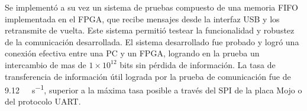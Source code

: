 Se implementó a su vez un sistema de pruebas compuesto de una memoria FIFO implementada en el FPGA, que recibe mensajes desde la interfaz USB y los retransmite de vuelta. Este sistema permitió testear la funcionalidad y robustez de la comunicación desarrollada.
El sistema desarrollado fue probado y logró una conexión efectiva entre una PC y un FPGA, logrando en la prueba un intercambio de mas de $1 \times 10^{12}$ bits sin pérdida de información. La tasa de transferencia de información útil lograda por la prueba de comunicación fue de \SI{9,12}{\mega\bit\per\second}, superior a la máxima tasa posible a través del SPI de la placa Mojo o del protocolo UART.


%
%
%
